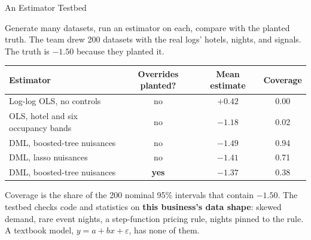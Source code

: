 \documentclass[aspectratio=169, 11pt, handout]{beamer}
\begin{document}
\begin{frame}{An Estimator Testbed}

Generate many datasets, run an estimator on each, compare with the planted truth. The team drew 200 datasets with the real logs' hotels, nights, and signals. The truth is $-1.50$ because they planted it.

\begin{center}
\small
\begin{tabular}{lccc}
\toprule
\textbf{Estimator} & \textbf{Overrides planted?} & \textbf{Mean estimate} & \textbf{Coverage} \\
\midrule
Log-log OLS, no controls & no & $+0.42$ & 0.00 \\
OLS, hotel and six occupancy bands & no & $-1.18$ & 0.02 \\
DML, boosted-tree nuisances & no & $-1.49$ & 0.94 \\
DML, lasso nuisances & no & $-1.41$ & 0.71 \\
DML, boosted-tree nuisances & \textbf{yes} & $-1.37$ & 0.38 \\
\bottomrule
\end{tabular}
\end{center}

\medskip

Coverage is the share of the 200 nominal 95\% intervals that contain $-1.50$. The testbed checks code and statistics on \textbf{this business's data shape}: skewed demand, rare event nights, a step-function pricing rule, nights pinned to the rule. A textbook model, $y = a + bx + \varepsilon$, has none of them.
\end{frame}
\end{document}

